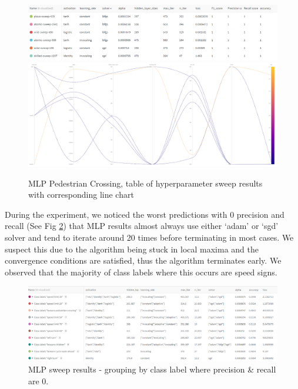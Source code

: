 \documentclass[11pt]{article}
\begin{document}
\begin{figure}[H]
  \centering 
  \includegraphics[width = \textwidth, height = 0.25\textwidth, keepaspectratio]{Images/MLPPedCrossingTable.png} 
  \includegraphics[width = \textwidth, height = 0.4\textwidth, keepaspectratio]{Images/MLPedCrossingGraph.png} 
  \caption {MLP Pedestrian Crossing, table of hyperparameter sweep results with corresponding line chart} \label{MLPPedCrossing}
\end{figure}
\FloatBarrier

During the experiment, we noticed the worst predictions with 0 precision and recall (See Fig \ref{MLPSweepResults}) that MLP results almost always use either ‘adam’ or ‘sgd’ solver and tend to iterate around 20 times before terminating in most cases. We suspect this due to the algorithm being stuck in local maxima and the convergence conditions are satisfied, thus the algorithm terminates early. We observed that the majority of class labels where this occurs are speed signs. 

\begin{figure}[H]
  \centering 
  \includegraphics[width = \textwidth, height = 0.5\textwidth, keepaspectratio]{Images/MLPSweepResults-precAndRecall.png} 
  \caption {MLP sweep results - grouping by class label where precision \& recall are 0.} \label{MLPSweepResults}
\end{figure}
\FloatBarrier
\end{document}

